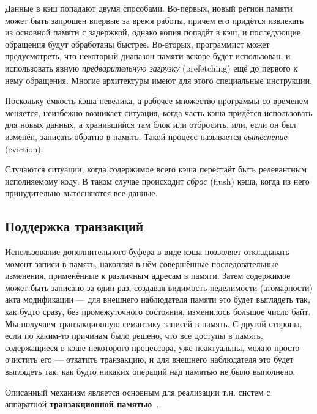 Данные в кэш попадают двумя способами. Во-первых, новый регион памяти может быть запрошен впервые за время работы, причем его придётся извлекать из основной памяти с задержкой, однако копия попадёт в кэш, и последующие обращения будут обработаны быстрее. Во-вторых, программист может предусмотреть, что некоторый диапазон памяти вскоре будет использован, и использовать явную \textit{предварительную загрузку} (\abbr prefetching) ещё до первого к нему обращения. Многие архитектуры имеют для этого специальные инструкции.

Поскольку ёмкость кэша невелика, а рабочее множество программы со временем меняется, неизбежно возникает ситуация, когда часть кэша придётся использовать для новых данных, а хранившийся там блок или отбросить, или, если он был изменён, записать обратно в память. Такой процесс называется \textit{вытеснение} (\abbr eviction).

Случаются ситуации, когда содержимое всего кэша перестаёт быть релевантным исполняемому коду. В таком случае происходит \textit{сброс} (\abbr flush) кэша, когда из него принудительно вытесняются все данные.

\subsection{Поддержка транзакций}

Использование дополнительного буфера в виде кэша позволяет откладывать момент записи в память, накопляя в нём совершённые последовательные изменения, применённые к различным адресам в памяти. Затем содержимое может быть записано за один раз, создавая видимость неделимости (атомарности) акта модификации ---  для внешнего наблюдателя памяти это будет выглядеть так, как будто сразу, без промежуточного состояния, изменилось большое число байт. Мы получаем транзакционную семантику записей в память. С другой стороны, если по каким-то причинам было решено, что все доступы в память, содержащиеся в кэше некоторого процессора, уже неактуальны, можно просто очистить его --- откатить транзакцию, и для внешнего наблюдателя это будет выглядеть так, как будто никаких операций над памятью не было выполнено.

Описанный  механизм является основным для реализации т.н. систем с аппаратной \textbf{транзакционной памятью}~\cite{rajwar2002}.

